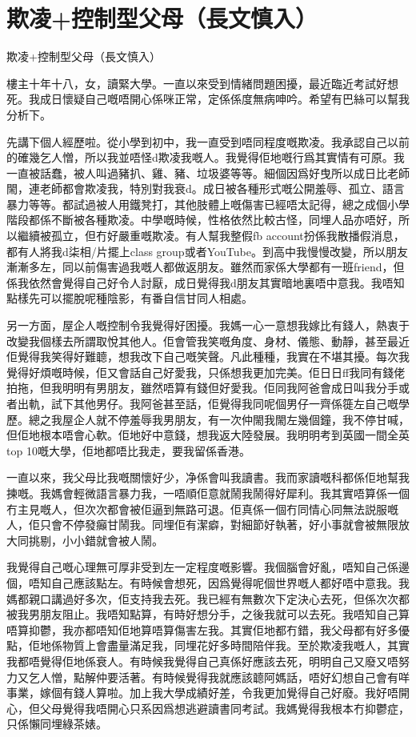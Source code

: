 \chapter{欺凌+控制型父母（長文慎入）}

欺凌+控制型父母（長文慎入）

樓主十年十八，女，讀緊大學。一直以來受到情緒問題困擾，最近臨近考試好想死。我成日懷疑自己嘅唔開心係咪正常，定係係度無病呻吟。希望有巴絲可以幫我分析下。

先講下個人經歷啦。從小學到初中，我一直受到唔同程度嘅欺凌。我承認自己以前的確幾乞人憎，所以我並唔怪d欺凌我嘅人。我覺得佢地嘅行爲其實情有可原。我一直被話蠢，被人叫過豬扒、雞、豬、垃圾婆等等。細個因爲好曳所以成日比老師閙，連老師都會欺凌我，特別對我衰d。成日被各種形式嘅公開羞辱、孤立、語言暴力等等。都試過被人用鐵凳打，其他肢體上嘅傷害已經唔太記得，總之成個小學階段都係不斷被各種欺凌。中學嘅時候，性格依然比較古怪，同埋人品亦唔好，所以繼續被孤立，但冇好嚴重嘅欺凌。有人幫我整假fb account扮係我散播假消息，都有人將我d柒相/片擺上class group或者YouTube。到高中我慢慢改變，所以朋友漸漸多左，同以前傷害過我嘅人都做返朋友。雖然而家係大學都有一班friend，但係我依然會覺得自己好令人討厭，成日覺得我d朋友其實暗地裏唔中意我。我唔知點樣先可以擺脫呢種陰影，有番自信甘同人相處。

另一方面，屋企人嘅控制令我覺得好困擾。我媽一心一意想我嫁比有錢人，熱衷于改變我個樣去所謂取悅其他人。佢會管我笑嘅角度、身材、儀態、動靜，甚至最近佢覺得我笑得好難聼，想我改下自己嘅笑聲。凡此種種，我實在不堪其擾。每次我覺得好煩嘅時候，佢又會話自己好愛我，只係想我更加完美。佢日日ff我同有錢佬拍拖，但我明明有男朋友，雖然唔算有錢但好愛我。佢同我阿爸會成日叫我分手或者出軌，試下其他男仔。我阿爸甚至話，佢覺得我同呢個男仔一齊係簁左自己嘅學歷。總之我屋企人就不停羞辱我男朋友，有一次仲閙我閙左幾個鐘，我不停甘喊，但佢地根本唔會心軟。佢地好中意錢，想我返大陸發展。我明明考到英國一間全英top 10嘅大學，佢地都唔比我走，要我留係香港。

一直以來，我父母比我嘅關懷好少，净係會叫我讀書。我而家讀嘅科都係佢地幫我揀嘅。我媽會輕微語言暴力我，一唔順佢意就鬧我鬧得好犀利。我其實唔算係一個冇主見嘅人，但次次都會被佢逼到無路可退。佢真係一個冇同情心同無法説服嘅人，佢只會不停發癲甘鬧我。同埋佢有潔癖，對細節好執著，好小事就會被無限放大同挑剔，小小錯就會被人鬧。

我覺得自己嘅心理無可厚非受到左一定程度嘅影響。我個腦會好亂，唔知自己係邊個，唔知自己應該點左。有時候會想死，因爲覺得呢個世界嘅人都好唔中意我。我媽都親口講過好多次，佢支持我去死。我已經有無數次下定決心去死，但係次次都被我男朋友阻止。我唔知點算，有時好想分手，之後我就可以去死。我唔知自己算唔算抑鬱，我亦都唔知佢地算唔算傷害左我。其實佢地都冇錯，我父母都有好多優點，佢地係物質上會盡量滿足我，同埋花好多時間陪伴我。至於欺凌我嘅人，其實我都唔覺得佢地係衰人。有時候我覺得自己真係好應該去死，明明自己又廢又唔努力又乞人憎，點解仲要活著。有時候覺得我就應該聼阿媽話，唔好幻想自己會有咩事業，嫁個有錢人算啦。加上我大學成績好差，令我更加覺得自己好廢。我好唔開心，但父母覺得我唔開心只系因爲想逃避讀書同考試。我媽覺得我根本冇抑鬱症，只係懶同埋綠茶婊。

